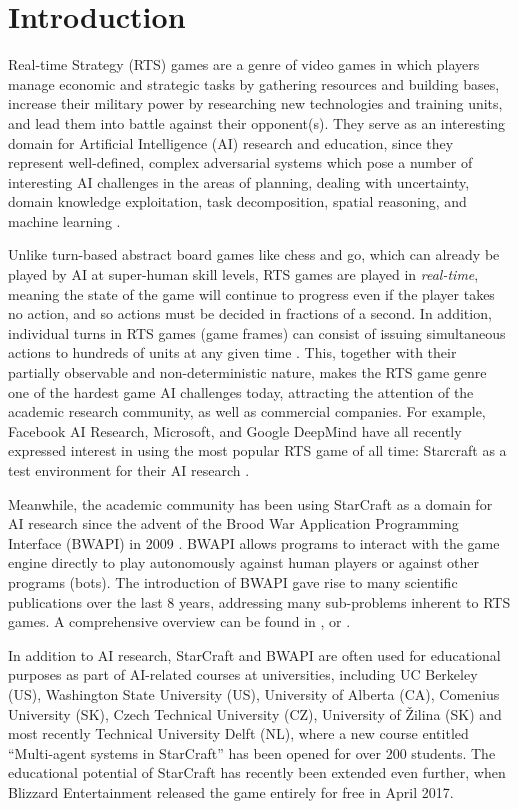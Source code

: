 \section{Introduction}\label{secIntro}

Real-time Strategy (RTS) games are a genre of video games in which players manage economic and strategic tasks by gathering resources and building bases, increase their military power by researching new technologies and training units, and lead them into battle against their opponent(s). They serve as an interesting domain for Artificial Intelligence (AI) research and education, since they represent well-defined, complex adversarial systems \cite{Buro2004} which pose a number of interesting AI challenges in the areas of planning, dealing with uncertainty, domain knowledge exploitation, task decomposition, spatial reasoning, and machine learning \cite{Survey2013}.

Unlike turn-based abstract board games like chess and go, which can already be played by AI at super-human skill levels, RTS games are played in \textit{real-time}, meaning the state of the game will continue to progress even if the player takes no action, and so actions must be decided in fractions of a second. In addition, individual turns in RTS games (game frames) can consist of issuing simultaneous actions to hundreds of units at any given time \cite{buro2012real}. This, together with their partially observable and non-deterministic nature, makes the RTS game genre one of the hardest game AI challenges today, attracting the attention of the academic research community, as well as commercial companies. For example, Facebook AI Research, Microsoft, and Google DeepMind have all recently expressed interest in using the most popular RTS game of all time: Starcraft as a test environment for their AI research \cite{gibney2016google}. 

Meanwhile, the academic community has been using StarCraft as a domain for AI research since the advent of the Brood War Application Programming Interface (BWAPI) in 2009 \cite{heinermann2013bwapi}. BWAPI allows programs to interact with the game engine directly to play autonomously against human players or against other programs (bots). The introduction of BWAPI gave rise to many scientific publications over the last 8 years, addressing many sub-problems inherent to RTS games. A comprehensive overview can be found in \cite{churchill2016starcraft}, \cite{ontanon2015rts} or \cite{Survey2013}.

In addition to AI research, StarCraft and BWAPI are often used for educational purposes as part of AI-related  courses at universities, including UC Berkeley (US), Washington State University (US), University of Alberta (CA), Comenius University (SK), Czech Technical University (CZ), University of \v{Z}ilina (SK) and most recently Technical University Delft (NL), where a new course entitled ``Multi-agent systems in StarCraft'' has been opened for over 200 students. The educational potential of StarCraft has recently been extended even further, when Blizzard Entertainment released the game entirely for free in April 2017.

